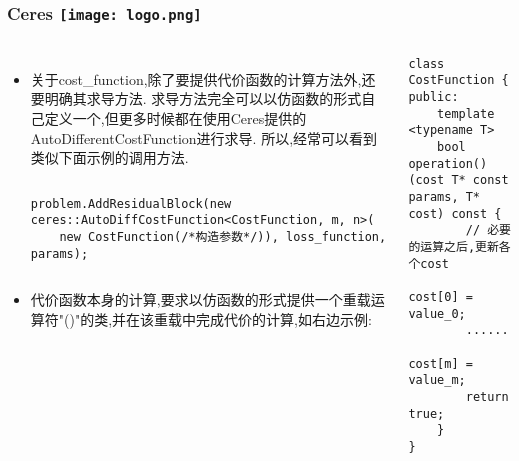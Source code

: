 \begin{comment}
\end{comment}
\begin{frame}[fragile]
\frametitle{Ceres \hfill \texttt{[image: logo.png]}}
\begin{columns}
	\begin{itemize}
		\item 关于cost\_function,除了要提供代价函数的计算方法外,还要明确其求导方法.
		求导方法完全可以以仿函数的形式自己定义一个,但更多时候都在使用Ceres提供的AutoDifferentCostFunction进行求导.
		所以,经常可以看到类似下面示例的调用方法.
\begin{columns}	
	\begin{minipage}{6.5cm}
        \begin{lstlisting}[frame=shadowbox]  
problem.AddResidualBlock(new ceres::AutoDiffCostFunction<CostFunction, m, n>(
    new CostFunction(/*构造参数*/)), loss_function, params);
        \end{lstlisting}
	\end{minipage}
\end{columns}

		\item 代价函数本身的计算,要求以仿函数的形式提供一个重载运算符"()"的类,并在该重载中完成代价的计算,如右边示例:
		\vspace{0.2cm}
	\end{itemize}

\begin{columns}	
\begin{minipage}{5cm}
\begin{lstlisting}[frame=shadowbox]  
class CostFunction {
public: 
    template <typename T>
    bool operation()(cost T* const params, T* cost) const {
        // 必要的运算之后,更新各个cost
        cost[0] = value_0;
        ......
        cost[m] = value_m;
        return true;
    }
}
\end{lstlisting}
\end{minipage}
\end{columns}
\end{columns}
\end{frame}

